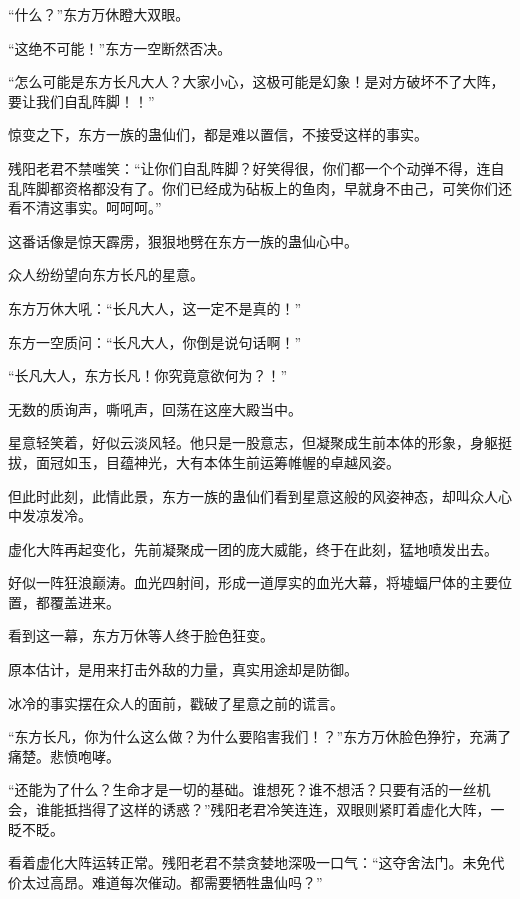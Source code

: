 
\begin{this_body}

“什么？”东方万休瞪大双眼。

“这绝不可能！”东方一空断然否决。

“怎么可能是东方长凡大人？大家小心，这极可能是幻象！是对方破坏不了大阵，要让我们自乱阵脚！！”

惊变之下，东方一族的蛊仙们，都是难以置信，不接受这样的事实。

残阳老君不禁嗤笑：“让你们自乱阵脚？好笑得很，你们都一个个动弹不得，连自乱阵脚都资格都没有了。你们已经成为砧板上的鱼肉，早就身不由己，可笑你们还看不清这事实。呵呵呵。”

这番话像是惊天霹雳，狠狠地劈在东方一族的蛊仙心中。

众人纷纷望向东方长凡的星意。

东方万休大吼：“长凡大人，这一定不是真的！”

东方一空质问：“长凡大人，你倒是说句话啊！”

“长凡大人，东方长凡！你究竟意欲何为？！”

无数的质询声，嘶吼声，回荡在这座大殿当中。

星意轻笑着，好似云淡风轻。他只是一股意志，但凝聚成生前本体的形象，身躯挺拔，面冠如玉，目蕴神光，大有本体生前运筹帷幄的卓越风姿。

但此时此刻，此情此景，东方一族的蛊仙们看到星意这般的风姿神态，却叫众人心中发凉发冷。

虚化大阵再起变化，先前凝聚成一团的庞大威能，终于在此刻，猛地喷发出去。

好似一阵狂浪巅涛。血光四射间，形成一道厚实的血光大幕，将墟蝠尸体的主要位置，都覆盖进来。

看到这一幕，东方万休等人终于脸色狂变。

原本估计，是用来打击外敌的力量，真实用途却是防御。

冰冷的事实摆在众人的面前，戳破了星意之前的谎言。

“东方长凡，你为什么这么做？为什么要陷害我们！？”东方万休脸色狰狞，充满了痛楚。悲愤咆哮。

“还能为了什么？生命才是一切的基础。谁想死？谁不想活？只要有活的一丝机会，谁能抵挡得了这样的诱惑？”残阳老君冷笑连连，双眼则紧盯着虚化大阵，一眨不眨。

看着虚化大阵运转正常。残阳老君不禁贪婪地深吸一口气：“这夺舍法门。未免代价太过高昂。难道每次催动。都需要牺牲蛊仙吗？”


\end{this_body}
